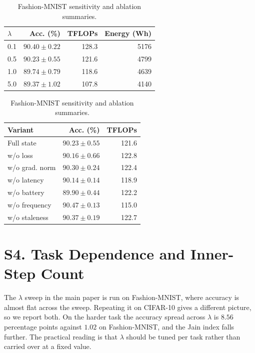 \documentclass[10pt]{article}
\begin{document}
\begin{table}[!ht]
\centering
\caption{Fashion-MNIST sensitivity and ablation summaries.}
\label{tab:supp_design}
\footnotesize
\begin{minipage}{0.48\textwidth}
\centering
\begin{tabular}{@{}lrrr@{}}
\toprule
$\lambda$ & Acc. (\%) & TFLOPs & Energy (Wh) \\
\midrule
0.1 & $90.40 \pm 0.22$ & 128.3 & 5176 \\
0.5 & $90.23 \pm 0.55$ & 121.6 & 4799 \\
1.0 & $89.74 \pm 0.79$ & 118.6 & 4639 \\
5.0 & $89.37 \pm 1.02$ & 107.8 & 4140 \\
\bottomrule
\end{tabular}
\end{minipage}
\hfill
\begin{minipage}{0.48\textwidth}
\centering
\begin{tabular}{@{}lrr@{}}
\toprule
Variant & Acc. (\%) & TFLOPs \\
\midrule
Full state & $90.23 \pm 0.55$ & 121.6 \\
w/o loss & $90.16 \pm 0.66$ & 122.8 \\
w/o grad. norm & $90.30 \pm 0.24$ & 122.4 \\
w/o latency & $90.14 \pm 0.14$ & 118.9 \\
w/o battery & $89.90 \pm 0.44$ & 122.2 \\
w/o frequency & $90.47 \pm 0.13$ & 115.0 \\
w/o staleness & $90.37 \pm 0.19$ & 122.7 \\
\bottomrule
\end{tabular}
\end{minipage}
\end{table}

\section*{S4. Task Dependence and Inner-Step Count}

The $\lambda$ sweep in the main paper is run on Fashion-MNIST, where accuracy is
almost flat across the sweep.  Repeating it on CIFAR-10 gives a different
picture, so we report both.  On the harder task the accuracy spread across
$\lambda$ is $8.56$ percentage points against $1.02$ on Fashion-MNIST, and the
Jain index falls further.  The practical reading is that $\lambda$ should be
tuned per task rather than carried over at a fixed value.
\end{document}
